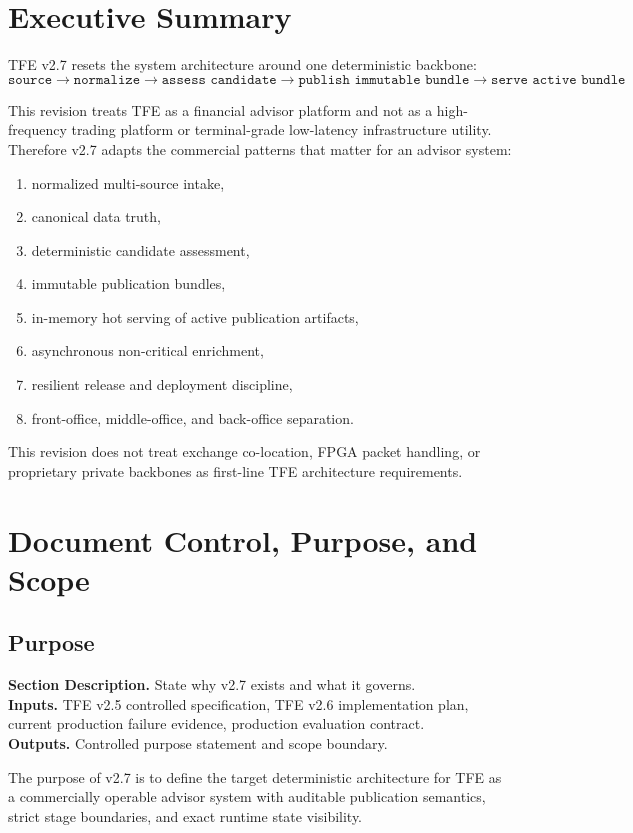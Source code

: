 \documentclass[11pt]{report}
\newcommand{\meta}[3]{\textbf{Section Description.} #1\\
\textbf{Inputs.} #2\\
\textbf{Outputs.} #3\par}
\begin{document}
\tableofcontents
\clearpage

\chapter*{Executive Summary}
TFE v2.7 resets the system architecture around one deterministic backbone:
\[
\texttt{source} \rightarrow \texttt{normalize} \rightarrow \texttt{assess candidate} \rightarrow \texttt{publish immutable bundle} \rightarrow \texttt{serve active bundle}
\]

This revision treats TFE as a financial advisor platform and not as a high-frequency trading platform or terminal-grade low-latency infrastructure utility. Therefore v2.7 adapts the commercial patterns that matter for an advisor system:
\begin{enumerate}[leftmargin=1.2cm]
    \item normalized multi-source intake,
    \item canonical data truth,
    \item deterministic candidate assessment,
    \item immutable publication bundles,
    \item in-memory hot serving of active publication artifacts,
    \item asynchronous non-critical enrichment,
    \item resilient release and deployment discipline,
    \item front-office, middle-office, and back-office separation.
\end{enumerate}

This revision does not treat exchange co-location, FPGA packet handling, or proprietary private backbones as first-line TFE architecture requirements.

\chapter{Document Control, Purpose, and Scope}
\section{Purpose}
\meta{State why v2.7 exists and what it governs.}{TFE v2.5 controlled specification, TFE v2.6 implementation plan, current production failure evidence, production evaluation contract.}{Controlled purpose statement and scope boundary.}

The purpose of v2.7 is to define the target deterministic architecture for TFE as a commercially operable advisor system with auditable publication semantics, strict stage boundaries, and exact runtime state visibility.
\end{document}
